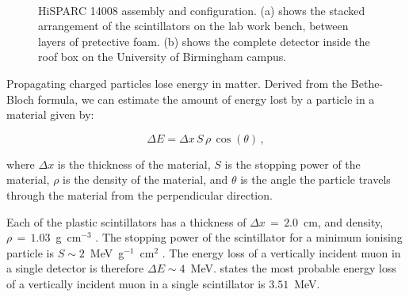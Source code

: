 \begin{figure}[ht!]
	\centering
	 \\
	
	\caption{HiSPARC 14008 assembly and configuration. (a) shows the stacked arrangement of the scintillators on the lab work bench, between layers of pretective foam. (b) shows the complete detector inside the roof box on the University of Birmingham campus.}
	\label{fig:HS_14008_setup}
\end{figure}


Propagating charged particles lose energy in matter. Derived from the Bethe-Bloch formula, we can estimate the amount of energy lost by a particle in a material given by:

\begin{equation}
\Delta E = \Delta x \, S \, \rho \, \cos(\theta) \, ,
\label{eq:energy_loss}
\end{equation}

where $\Delta x$ is the thickness of the material, $S$ is the stopping power of the material, $\rho$ is the density of the material, and $\theta$ is the angle the particle travels through the material from the perpendicular direction.

Each of the plastic scintillators has a thickness of $\Delta x \, = \, 2.0$~cm, and density, $\rho \, = \, 1.03$~g~cm$^{-3}$ \citep{montanus_observability_2017}. The stopping power of the scintillator for a minimum ionising particle is $S \sim 2$~MeV~g$^{-1}$~cm$^{2}$ \citep{fokkema_hisparc_2012, montanus_observability_2017}. The energy loss of a vertically incident muon in a single detector is therefore $\Delta E \sim 4$~MeV. \cite{van_dam_hisparc_2020} states the most probable energy loss of a vertically incident muon in a single scintillator is $3.51$~MeV.

